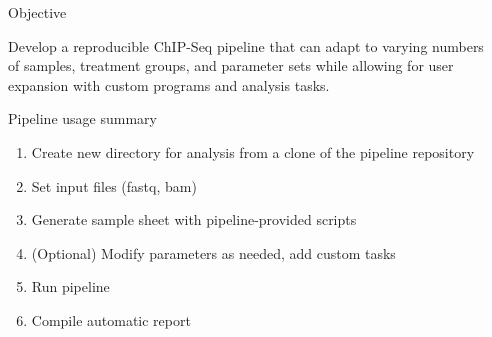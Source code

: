 \documentclass[final]{beamer}
\newlength{\sepwid}
\newlength{\onecolwid}
\begin{document}
\begin{frame}[t] %

\begin{columns}[t] %

\begin{column}{\sepwid}\end{column} %

\begin{column}{\onecolwid} %


\begin{beamerboxesrounded}{Objective}

Develop a reproducible ChIP-Seq pipeline that can adapt to varying numbers of samples, treatment groups, and parameter sets while allowing for user expansion with custom programs and analysis tasks. 

\end{beamerboxesrounded}\hfill

%	


\begin{beamerboxesrounded}{Pipeline usage summary}


\begin{enumerate}
\item Create new directory for analysis from a clone of the pipeline repository
\item Set input files (fastq, bam)
\item Generate sample sheet with pipeline-provided scripts
\item (Optional) Modify parameters as needed, add custom tasks
\item Run pipeline
\item Compile automatic report
\end{enumerate}


\end{beamerboxesrounded}
\end{column}
\end{columns}
\end{frame}
\end{document}

